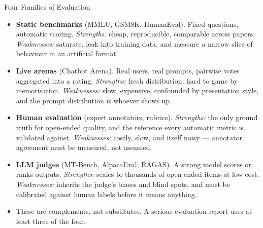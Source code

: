 \begin{frame}{Four Families of Evaluation}
  \begin{itemize}\footnotesize\itemsep0.35em
    \item[\textcolor{red}{$\blacktriangleright$}] \textbf{Static benchmarks} (MMLU, GSM8K, HumanEval). Fixed questions, automatic scoring. \textit{Strengths:} cheap, reproducible, comparable across papers. \textit{Weaknesses:} saturate, leak into training data, and measure a narrow slice of behaviour in an artificial format.
    \item[\textcolor{red}{$\blacktriangleright$}] \textbf{Live arenas} (Chatbot Arena). Real users, real prompts, pairwise votes aggregated into a rating. \textit{Strengths:} fresh distribution, hard to game by memorisation. \textit{Weaknesses:} slow, expensive, confounded by presentation style, and the prompt distribution is whoever shows up.
    \item[\textcolor{red}{$\blacktriangleright$}] \textbf{Human evaluation} (expert annotators, rubrics). \textit{Strengths:} the only ground truth for open-ended quality, and the reference every automatic metric is validated against. \textit{Weaknesses:} costly, slow, and itself noisy --- annotator agreement must be measured, not assumed.
    \item[\textcolor{red}{$\blacktriangleright$}] \textbf{LLM judges} (MT-Bench, AlpacaEval, RAGAS). A strong model scores or ranks outputs. \textit{Strengths:} scales to thousands of open-ended items at low cost. \textit{Weaknesses:} inherits the judge's biases and blind spots, and must be calibrated against human labels before it means anything.
    \item[\textcolor{red}{$\blacktriangleright$}] These are complements, not substitutes. A serious evaluation report uses at least three of the four.
  \end{itemize}
\end{frame}


